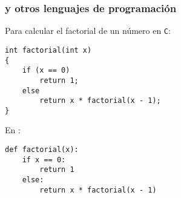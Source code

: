\begin{frame}[fragile]
\frametitle{\python y otros lenguajes de programación}
Para calcular el factorial de un número en \texttt{C}:
\begin{verbatim}
int factorial(int x)
{
    if (x == 0)
        return 1;
    else
        return x * factorial(x - 1);
}
\end{verbatim}
En \python:
\begin{verbatim}
def factorial(x):
    if x == 0:
        return 1
    else:
        return x * factorial(x - 1)
\end{verbatim}

\end{frame}
